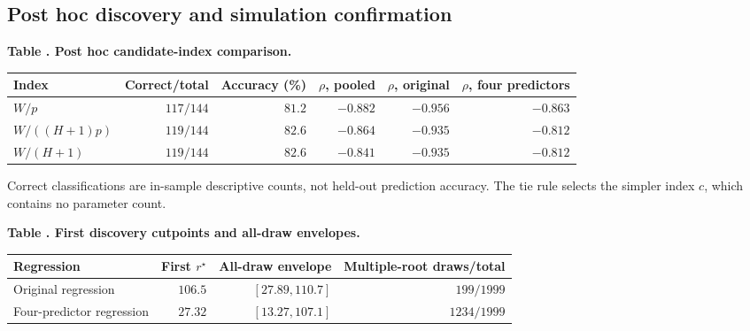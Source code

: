 \clearpage\begingroup\footnotesize
\setlength{\tabcolsep}{3.5pt}\renewcommand{\arraystretch}{1.08}
\subsection*{Post hoc discovery and simulation confirmation}
\par\medskip{}\label{tab:v9-discovery-scores}
\noindent\textbf{Table \thetable. Post hoc candidate-index comparison.}\par
\begin{center}\begin{tabular}{lrrrrr}
\toprule
Index & Correct/total & Accuracy (\%) & $\rho$, pooled & $\rho$, original & $\rho$, four predictors \\
\midrule
$W/p$ & $117/144$ & $81.2$ & $-0.882$ & $-0.956$ & $-0.863$ \\ %
$W/((H+1)p)$ & $119/144$ & $82.6$ & $-0.864$ & $-0.935$ & $-0.812$ \\ %
$W/(H+1)$ & $119/144$ & $82.6$ & $-0.841$ & $-0.935$ & $-0.812$ \\ %
\bottomrule
\end{tabular}\end{center}
\noindent\begin{minipage}{0.98\linewidth}\scriptsize Correct classifications are in-sample descriptive counts, not held-out prediction accuracy. The tie rule selects the simpler index $c$, which contains no parameter count.\end{minipage}\par\smallskip
\par\medskip{}\label{tab:v9-discovery-cutpoints}
\noindent\textbf{Table \thetable. First discovery cutpoints and all-draw envelopes.}\par
\begin{center}\begin{tabular}{p{33mm}rrr}
\toprule
Regression & First $r^\star$ & All-draw envelope & Multiple-root draws/total \\
\midrule
Original regression & $106.5$ & $[27.89, 110.7]$ & $199/1999$ \\ %
Four-predictor regression & $27.32$ & $[13.27, 107.1]$ & $1234/1999$ \\ %
\bottomrule
\end{tabular}\end{center}
